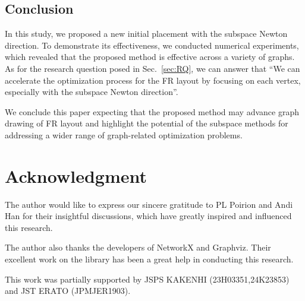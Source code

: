 \documentclass[dvipdfmx,10pt,journal,compsoc]{IEEEtran}
\begin{document}
\subsection{Conclusion} \label{sec:conclusion}

In this study, we proposed a new initial placement with the subspace Newton direction.
To demonstrate its effectiveness, we conducted numerical experiments, which revealed that the proposed method is effective across a variety of graphs. As for the research question posed in Sec.~\ref{sec:RQ}, we can answer that ``We can accelerate the optimization process for the FR layout by focusing on each vertex, especially with the subspace Newton direction''.

We conclude this paper expecting that the proposed method may advance graph drawing of FR layout and highlight the potential of the subspace methods for addressing a wider range of graph-related optimization problems.

\section{Acknowledgment}

The author would like to express our sincere gratitude to PL Poirion and Andi Han for their insightful discussions, which have greatly inspired and influenced this research.

The author also thanks the developers of NetworkX and Graphviz. Their excellent work on the library has been a great help in conducting this research.

This work was partially supported by JSPS KAKENHI (23H03351,24K23853) and JST ERATO (JPMJER1903).

\end{document}
